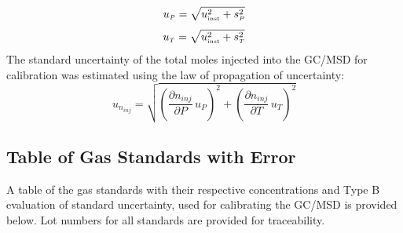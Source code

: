 \documentclass[12pt]{article}
\begin{document}
\begin{equation}
\label{eq:pressure_uncertainty}
u_{\scriptscriptstyle P} = \sqrt{ u_{\rm \scriptscriptstyle inst}^2 + s_{\scriptscriptstyle P}^2}
\end{equation}
\begin{equation}
\label{eq:temp_uncertainty}
u_{\scriptscriptstyle T} = \sqrt{ u_{\rm \scriptscriptstyle inst}^2 + s_{\scriptscriptstyle T}^2}
\end{equation}
The standard uncertainty of the total moles injected into the GC/MSD for calibration was estimated using the law of propagation of uncertainty:
\begin{equation}
\label{eq:moles_injected_uncertainty}
u_{\scriptscriptstyle n_{inj}} = \sqrt{{\left( \frac{\partial n_{inj}}{\partial P}\,u_{\scriptscriptstyle P} \right) }^2+{\left(\frac{\partial n_{inj}}{\partial T}\,u_{\scriptscriptstyle T}\right)}^2}
\end{equation}

\pagebreak
\subsection{Table of Gas Standards with Error}
\label{sssec:Table of Gas Standards with Error}
A table of the gas standards with their respective concentrations and Type B evaluation of standard uncertainty, used for calibrating the GC/MSD is provided below. Lot numbers for all standards are provided for traceability.
\end{document}

